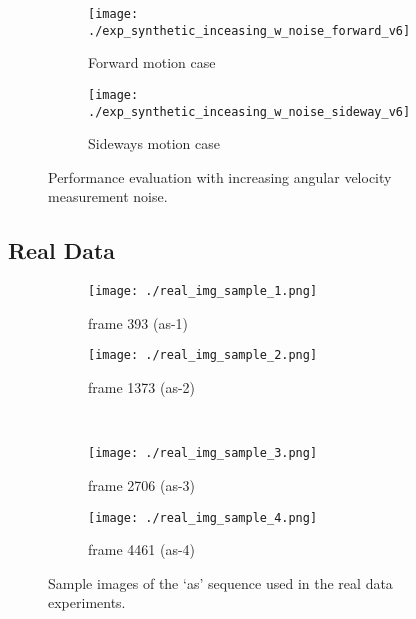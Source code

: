 \documentclass[10pt,twocolumn,letterpaper]{article}
\theoremstyle{definition}
\begin{document}
	
	\begin{figure}[t]
		\begin{subfigure}[b]{0.99\linewidth}
			\texttt{[image: ./exp\_synthetic\_inceasing\_w\_noise\_forward\_v6]}
			\caption{Forward motion case}
		\end{subfigure}
		\begin{subfigure}[b]{0.99\linewidth}
			\texttt{[image: ./exp\_synthetic\_inceasing\_w\_noise\_sideway\_v6]}
			\caption{Sideways motion case}
		\end{subfigure}%
		\caption{Performance evaluation with increasing angular velocity measurement noise.}
		\label{fig:exp_synthetic_w_noise}
	\end{figure}  
	
	
	
	
	\subsection{Real Data}
	
	
	
	
	\begin{figure}[t]
		\centering	
		\begin{subfigure}[b]{0.49\linewidth}
			\texttt{[image: ./real\_img\_sample\_1.png]}
			\caption{frame 393 (as-1)}
		\end{subfigure}
		\begin{subfigure}[b]{0.49\linewidth}
			\texttt{[image: ./real\_img\_sample\_2.png]}
			\caption{frame 1373 (as-2)}
		\end{subfigure}\\ \vspace{2mm}
		\begin{subfigure}[b]{0.49\linewidth}
			\texttt{[image: ./real\_img\_sample\_3.png]}
			\caption{frame 2706 (as-3)}
		\end{subfigure}
		\begin{subfigure}[b]{0.49\linewidth}
			\texttt{[image: ./real\_img\_sample\_4.png]}
			\caption{frame 4461 (as-4)}
		\end{subfigure}
		\caption{Sample images of the `as' sequence used in the real data experiments.}		
		\label{fig:real_data_sample_images} 
	\end{figure}
	
\end{document}
